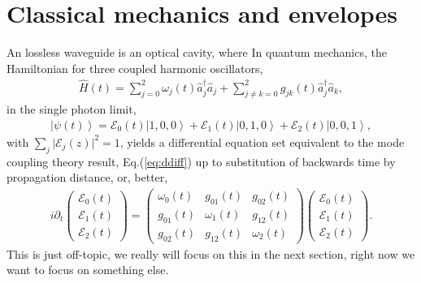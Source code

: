 \documentclass[9pt,twocolumn,twoside]{osajnl}
\begin{document}
\section{Classical mechanics and envelopes}
An lossless waveguide is an optical cavity, where  
In quantum mechanics, the Hamiltonian for three coupled harmonic oscillators, 
\begin{eqnarray}
	\hat{H}(t) = \sum_{j=0}^{2} \omega_j(t) \hat{a}^{\dagger}_j \hat{a}_{j} + \sum_{j\neq k=0}^{2} g_{jk}(t) \hat{a}^{\dagger}_j \hat{a}_k,
\end{eqnarray}
in the single photon limit,
\begin{eqnarray}
	\left\vert \psi(t) \right\rangle = \mathcal{E}_{0}(t) \left\vert 1, 0, 0 \right\rangle  +
	\mathcal{E}_{1}(t) \left\vert 0,1,0 \right\rangle + \mathcal{E}_{2}(t) \left\vert 0,0,1 \right\rangle,
\end{eqnarray}
with $ \sum_{j} \vert \mathcal{E}_{j}(z) \vert^2 = 1$, yields a differential equation set equivalent to the mode coupling theory result, Eq.(\ref{eq:ddiff}) up to substitution of backwards time by propagation distance, or, better, 
\begin{eqnarray}
	i \partial_t	
	\left( \begin{array}{c} 
		\mathcal{E}_{0}(t) \\
		\mathcal{E}_{1}(t) \\
		\mathcal{E}_{2}(t)
	\end{array} \right) =
	\left( \begin{array}{ccc} 
		\omega_{0}(t)  & g_{01}(t) & g_{02}(t) \\
		g_{01}(t) & \omega_{1}(t) & g_{12}(t) \\
		g_{02}(t) & g_{12}(t) & \omega_{2}(t)
	\end{array} \right)
	\left( \begin{array}{c} 
		\mathcal{E}_{0}(t) \\
		\mathcal{E}_{1}(t) \\
		\mathcal{E}_{2}(t)
	\end{array} \right) .
\end{eqnarray}
This is just off-topic, we really will focus on this in the next section, right now we want to focus on something else.
\end{document}
